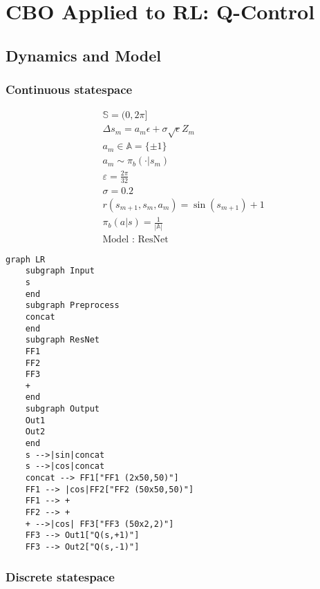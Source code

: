 \hypertarget{cbo-applied-to-rl-q-control}{%
\section{CBO Applied to RL:
Q-Control}\label{cbo-applied-to-rl-q-control}}

\hypertarget{dynamics-and-model}{%
\subsection{Dynamics and Model}\label{dynamics-and-model}}

\hypertarget{continuous-statespace}{%
\subsubsection{Continuous statespace}\label{continuous-statespace}}

\[
\begin{aligned}
&\mathbb S = (0, 2\pi]\\
&\Delta s_{m} = a_m\epsilon + \sigma \sqrt{\epsilon} Z_m\\
&a_m \in\mathbb A = \{\pm 1\}\\
&a_m\sim \pi_b(\cdot|s_m)\\
&\varepsilon = \tfrac{2\pi}{32}\\
&\sigma = 0.2\\
&r(s_{m+1},s_{m},a_m) = \sin(s_{m+1})+1\\
&\pi_b(a|s)=\tfrac{1}{|\mathbb A|}\\
&\text{Model : ResNet}
\end{aligned}
\]

\begin{verbatim}
graph LR
    subgraph Input
    s
    end
    subgraph Preprocess
    concat
    end
    subgraph ResNet
    FF1
    FF2
    FF3
    +
    end
    subgraph Output
    Out1
    Out2
    end
    s -->|sin|concat
    s -->|cos|concat
    concat --> FF1["FF1 (2x50,50)"]
    FF1 --> |cos|FF2["FF2 (50x50,50)"]
    FF1 --> +
    FF2 --> +
    + -->|cos| FF3["FF3 (50x2,2)"]
    FF3 --> Out1["Q(s,+1)"]
    FF3 --> Out2["Q(s,-1)"]
\end{verbatim}

\hypertarget{discrete-statespace}{%
\subsubsection{Discrete statespace}\label{discrete-statespace}}

